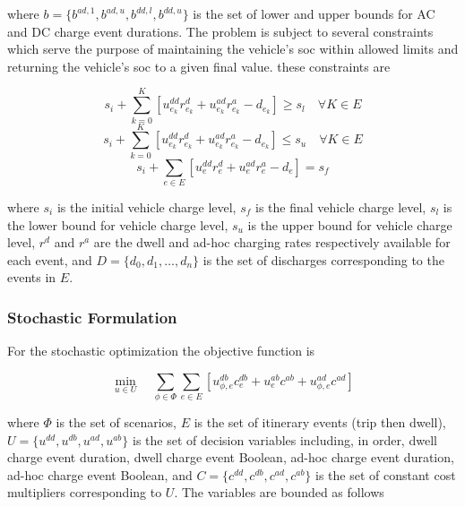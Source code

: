 \documentclass[letterpaper]{sae}
\begin{document}
where $b = \{b^{ad,1}, b^{ad,u}, b^{dd,l}, b^{dd,u}\}$ is the set of lower and upper bounds for AC and DC charge event durations. The problem is subject to several constraints which serve the purpose of maintaining the vehicle's \gls{soc} within allowed limits and returning the vehicle's \gls{soc} to a given final value. these constraints are

\begin{equation}
	s_i+\sum_{k=0}^{K}[u_{e_k}^{dd}r_{e_k}^{d}+u_{e_k}^{ad}r_{e_k}^{a}-d_{e_k}]\geq s_{l}\quad \forall K\in E
\end{equation}
\begin{equation}
	s_i+\sum_{k=0}^{K}[u_{e_k}^{dd}r_{e_k}^{d}+u_{e_k}^{ad}r_{e_k}^{a}-d_{e_k}]\leq s_{u}\quad \forall K\in E
\end{equation}
\begin{equation}
	s_i+\sum_{e\in E}[u_{e}^{dd}r_{e}^{d}+u_{e}^{ad}r_{e}^{a}-d_{e}]=s_f
\end{equation}

where $s_i$ is the initial vehicle charge level, $s_f$ is the final vehicle charge level, $s_{l}$ is the lower bound for vehicle charge level, $s_{u}$ is the upper bound for vehicle charge level, $r^d$ and $r^a$ are the dwell and ad-hoc charging rates respectively available for each event, and $D=\{d_0,d_1,\dots,d_n\}$ is the set of discharges corresponding to the events in $E$.

\subsubsection{Stochastic Formulation}

For the stochastic optimization the objective function is

\begin{equation}
	\min_{u\in U}\quad \sum_{\phi\in \Phi}\sum_{e\in E}[u_{\phi,e}^{db}c_{e}^{db}+u_{e}^{ab}c^{ab}+u_{\phi,e}^{ad}c^{ad}] \label{eq:obj_s}
\end{equation}

where $\Phi$ is the set of scenarios, $E$ is the set of itinerary events (trip then dwell), $U=\{u^{dd},u^{db},u^{ad},u^{ab}\}$ is the set of decision variables including, in order, dwell charge event duration, dwell charge event Boolean, ad-hoc charge event duration, ad-hoc charge event Boolean, and  $C=\{c^{dd},c^{db},c^{ad},c^{ab}\}$ is the set of constant cost multipliers corresponding to $U$. The variables are bounded as follows
\end{document}
